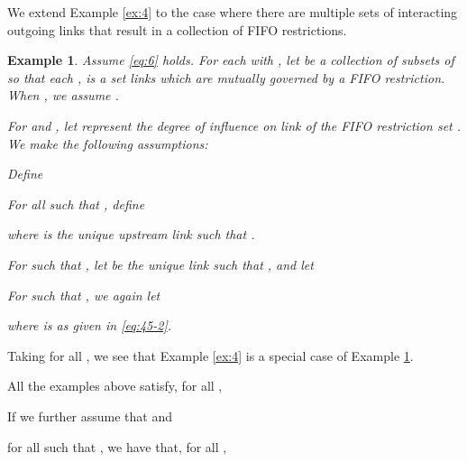 \documentclass[letterpaper, 10 pt, conference]{ieeeconf}
\newtheorem{example}{Example}
\begin{document}
We extend Example \ref{ex:4} to the case where there are multiple sets of interacting outgoing links that result in a collection of FIFO restrictions.
\newcommand{\F}{\mathcal{F}}
\begin{example}
  \label{ex:5}
Assume \eqref{eq:6} holds. For each  with , let  be a collection of subsets of  so that each ,  is a set links which are mutually governed by a FIFO restriction. When , we assume .

 For  and , let  represent the degree of influence on link  of the FIFO restriction set . We make the following assumptions:

Define

For all  such that , define

where  is the unique upstream link such that .

For  such that , let  be the unique link such that , and let

For  such that , we again let

where  is as given in \eqref{eq:45-2}.
\end{example}
Taking  for all , we see that Example \ref{ex:4} is a special case of Example \ref{ex:5}.

All the examples above satisfy, for all ,


If we further assume that  and 

for all  such that , we have that, for all ,
\end{document}

